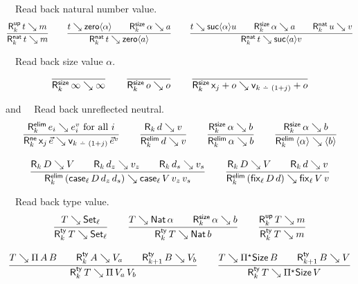\documentclass[acmsmall%
]{acmart}\settopmatter{printfolios=true}
\begin{document}
\noindent
{}\ \ Read back natural number value.
\begin{gather*}
  \ru{%
      \RUp k t m
    }{\RNat k t m}
\qquad
  \ru{t \evalsto \zero{\alpha} \qquad
      \RSize k {\alpha} a
    }{\RNat k t {\zero a}}
\qquad
  \ru{t \evalsto \suc{\alpha}u \qquad
      \RSize k {\alpha} a \qquad
      \RNat k u v
    }{\RNat k t {\suc a v}}
\end{gather*}

\noindent
{}\ \ Read back size value $\alpha$.
\vspace{-1.5ex}
\begin{gather*}
  \ru{
    }{\RSize k \infty \infty}
\qquad
  \ru{
    }{\RSize k o o}
\qquad
  \ru{
    }{\RSize k {\lev j + o} {\ind{k\dotminus(1+j)} + o}}
\end{gather*}

\noindent
{} and \ \ Read back unreflected neutral.
\begin{gather*}
  \ru{%
      \RElim k {e_i} {e^v_i} \mforall i
    }{\RNe k {\lev j\,\vec e} {\ind{k \monus (1+j)}\,\vec e^v}}
\qquad
  \ru{\R k d v
    }{\RElim k d v}
\qquad
  \ru{\RSize k \alpha b
    }{\RElim k \alpha b}
\qquad
  \ru{\RSize k \alpha b
    }{\RElim k {\ann \alpha} {\ann b}}
\\[2ex]
  \ru{\R k D V \qquad
      \R k {d_z} {v_z} \qquad
      \R k {d_s} {v_s}
    }{\RElim k {(\case[\ell] D {d_z} {d_s})} {\case[\ell] V {v_z} {v_s}}}
\qquad
  \ru{\R k D V \qquad
      \R k d v
    }{\RElim k {(\fix[\ell] D d)} {\fix[\ell] V v}}
\end{gather*}

\noindent
{} \ \ Read back type value.
\begin{gather*}
  \ru{T \evalsto \Set[\ell]
    }{\RTy k T {\Set[\ell]}}
\qquad
  \ru{T \evalsto \Nat \alpha \qquad
      \RSize k \alpha b
    }{\RTy k T {\Nat b}}
\qquad
  \ru{%
      \RUp k T m
    }{\RTy k T m}
\\[2ex]
  \ru{T \evalsto \piT A B \qquad
      \RTy k A {V_a} \qquad
      \RTy {k+1} B {V_b}
    }{\RTy k T {\piT {V_a} V_b}}
\qquad
  \ru{T \evalsto \epiT \Size B \qquad
      \RTy {k+1} B {V}
    }{\RTy k T {\epiT \Size V}}
\end{gather*}
\end{document}
